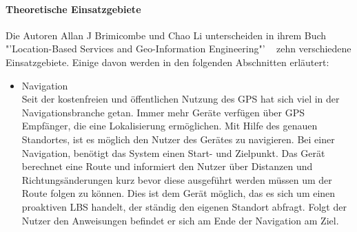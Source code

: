 \paragraph{Theoretische Einsatzgebiete}
Die Autoren Allan J Brimicombe und Chao Li unterscheiden in ihrem Buch "'Location-Based Services and Geo-Information Engineering"' ~\cite[S.132]{brimicombe_li:application_area} zehn verschiedene Einsatzgebiete. Einige davon werden in den folgenden Abschnitten erläutert:
\begin{itemize}
	\item Navigation\\
Seit der kostenfreien und öffentlichen Nutzung des GPS hat sich viel in der Navigationsbranche getan. Immer mehr Geräte verfügen über GPS Empfänger, die eine Lokalisierung ermöglichen. Mit Hilfe des genauen Standortes, ist es möglich den Nutzer des Gerätes zu navigieren. Bei einer Navigation, benötigt das System einen Start- und Zielpunkt. Das Gerät berechnet eine Route und informiert den Nutzer über Distanzen und Richtungsänderungen kurz bevor diese ausgeführt werden müssen um der Route folgen zu können. Dies ist dem Gerät möglich, das es sich um einen proaktiven LBS handelt, der ständig den eigenen Standort abfragt. Folgt der Nutzer den Anweisungen befindet er sich am Ende der Navigation am Ziel.


\end{itemize}
